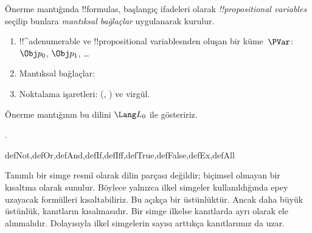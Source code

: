 



Önerme mantığında !!{formula}s, başlangıç ifadeleri olarak
\emph{!!{propositional variable}s} seçilip bunlara \emph{mantıksal bağlaçlar}
uygulanarak kurulur.

\begin{enumerate}
\item !!^a{denumerable} ve !!{propositional variable}s{}nden oluşan bir
  küme~$\PVar$:
  $\Obj p_0$, $\Obj p_1$, \dots
{}
\item Mantıksal bağlaçlar:
  \startycommalist
\item Noktalama işaretleri: (, ) ve virgül.
\end{enumerate}

Önerme mantığının bu dilini $\Lang L_0$ ile gösteririz.

.

\begin{tagblock}{defNot,defOr,defAnd,defIf,defIff,defTrue,defFalse,defEx,defAll}
\begin{explain}
Tanımlı bir simge resmî olarak dilin parçası değildir; biçimsel olmayan bir
kısaltma olarak sunulur. Böylece yalnızca ilkel simgeler kullanıldığında epey
uzayacak formülleri kısaltabiliriz. Bu açıkça bir üstünlüktür. Ancak daha
büyük üstünlük, kanıtların kısalmasıdır. Bir simge ilkelse kanıtlarda ayrı
olarak ele alınmalıdır. Dolayısıyla ilkel simgelerin sayısı arttıkça
kanıtlarımız da uzar.
\end{explain}
\end{tagblock}

